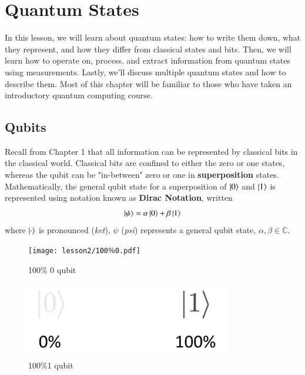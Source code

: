 \chapter[Quantum States]{Quantum States}
\label{sec:2_quantum_states}




In this lesson, we will learn about quantum states: how to write them down, what they represent, and how they differ from classical states and bits.
Then, we will learn how to operate on, process, and extract information from quantum states using measurements. Lastly, we'll discuss multiple quantum states and how to describe them.  Most of this chapter will be familiar to those who have taken an introductory quantum computing course.


\section{Qubits}


Recall from Chapter 1 that all information can be represented by classical bits in the classical world. Classical bits are confined to either the zero or one states, whereas the qubit can be "in-between" zero or one in  \textbf{superposition} states. Mathematically, the general qubit state for a superposition of $\ket{0}$ and $\ket{1}$ is represented using notation known as \textbf{Dirac Notation}, written
\begin{equation}
\ket{\psi} = \alpha \ket{0} + \beta\ket{1} 
\end{equation}
 where $\ket{\cdot}$ is pronounced (\emph{ket}), $\psi$ (\emph{psi}) represents a general qubit state, $\alpha,\beta \in \mathbb{C}$.

\begin{figure}[H]
    \centering
    \texttt{[image: lesson2/100％0.pdf]}
        \caption{100\% 0 qubit}
    \label{fig:100-zero}
\end{figure}

\begin{figure}[H]
    \centering
    \includegraphics[width=0.8\textwidth]{lesson2/100_1.pdf}
    
        \caption{100\%1 qubit}
    
    \label{fig:100-one}
\end{figure}

